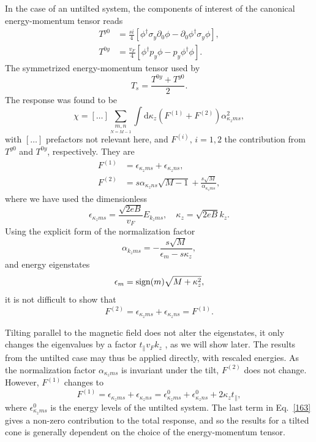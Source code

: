 In the case of an untilted system, the components of interest of the canonical energy-momentum tensor reads
\begin{subequations}
\begin{align}
  T^{y 0} &= \frac{s i}{4}
  \left[
  \phi^{\dagger} \sigma_y \partial_{0} \phi - \partial_0 \phi^{\dagger} \sigma_y \phi
  \right],\\
  T^{0 y} &= \frac{v_F}{4}
  \left[
  \phi^{\dagger} p_y \phi - p_y \phi^{\dagger} \phi
  \right].
\end{align}
\end{subequations}
The symmetrized energy-momentum tensor used by \textcite{arjonaFingerprintsConformalAnomaly2019}
\begin{equation}
  T_s = \frac{T^{0y} + T^{y0}}{2}.
\end{equation}
The response was found to be
\begin{equation}
  \chi = [\dots] \sum\limits_{\underset{N=M-1}{m,n}}^{} \int \mathrm{d} \kappa_z (F^{(1)} + F^{(2)}) \alpha_{\kappa_z m s}^2,
\end{equation}
with \( [\dots] \) prefactors not relevant here, and \( F^{(i)},\, i=1,2 \) the contribution from \( T^{y0} \) and \( T^{0y} \), respectively.
They are
\begin{align}
  F^{(1)} &= \epsilon_{\kappa_z m s} + \epsilon_{\kappa_z n s},\\
  F^{(2)} &= s \alpha_{\kappa_z n s} \sqrt{M-1} + \frac{s \sqrt{M}}{\alpha_{\kappa_z m s}},
\end{align}
where we have used the dimensionless
\[
  \epsilon_{\kappa_z m s} = \frac{\sqrt{2eB}}{v_{F}} E_{k_z m s}, \quad \kappa_z = \sqrt{2 e B} k_z.
\]
Using the explicit form of the normalization factor
\[
  \alpha_{k_z m s} = - \frac{s \sqrt{M}}{\epsilon_{m} - s \kappa_z},
\]
and energy eigenstates
\[
  \epsilon_m = \operatorname{sign} (m) \sqrt{M + \kappa_{z}^2},
\]
it is not difficult to show that
\begin{equation}
  F^{(2)} = \epsilon_{\kappa_z m s} + \epsilon_{\kappa_z n s} = F^{(1)}.
\end{equation}

Tilting parallel to the magnetic field does not alter the eigenstates, it only changes the eigenvalues by a factor \( t_{\parallel} v_F k_z \) \cites{yuPredictedUnusualMagnetoresponse2016,tchoumakovMagneticFieldInducedRelativisticProperties2016}, as we will show later.
The results from the untilted case may thus be applied directly, with rescaled energies.
As the normalization factor \( \alpha_{\kappa_z m s} \) is invariant under the tilt, \( F^{(2)} \) does not change.
However, \( F^{(1)} \) changes to
\begin{equation}
  \label{eq:163}
  F^{(1)} = \epsilon_{\kappa_z m s} + \epsilon_{\kappa_z n s} = \epsilon^0_{\kappa_z m s} + \epsilon^0_{\kappa_z n s} + 2 \kappa_z t_{\parallel},
\end{equation}
where \( \epsilon^0_{\kappa_z m s} \) is the energy levels of the untilted system.
The last term in Eq.~\eqref{163} gives a non-zero contribution to the total response, and so the results for a tilted cone is generally dependent on the choice of the energy-momentum tensor.


